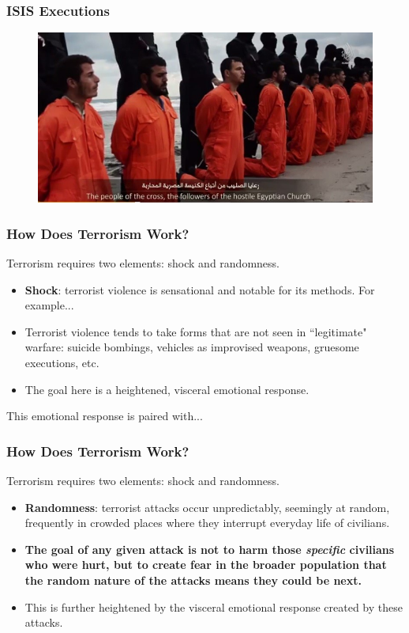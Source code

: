 \documentclass{beamer}
\begin{document}
\begin{frame} 
	\frametitle{\LARGE{ISIS Executions}}
	\begin{figure}[ht!]
		\centering
		\includegraphics[width=\textwidth,height=0.9\textheight,keepaspectratio]{ISISexec.jpg}
	\end{figure}
\end{frame}

\begin{frame} 
	\frametitle{\LARGE{How Does Terrorism Work?}}
	Terrorism requires two elements: shock and randomness.
	\begin{itemize}
		\item \textbf{Shock}: terrorist violence is sensational and notable for its methods. For example...	
		\item Terrorist violence tends to take forms that are not seen in ``legitimate" warfare: suicide bombings, vehicles as improvised weapons, gruesome executions, etc. \pause
		\item The goal here is a heightened, visceral emotional response.	
	\end{itemize}
This emotional response is paired with...
\end{frame}

\begin{frame} 
	\frametitle{\LARGE{How Does Terrorism Work?}}
Terrorism requires two elements: shock and randomness.
	\begin{itemize}
		\item \textbf{Randomness}: terrorist attacks occur unpredictably, seemingly at random, frequently in crowded places where they interrupt everyday life of civilians. \pause
		\item \textbf{The goal of any given attack is not to harm those \textit{specific} civilians who were hurt, but to create fear in the broader population that the random nature of the attacks means they could be next.} \pause
		\item This is further heightened by the visceral emotional response created by these attacks.
	\end{itemize}
\end{frame}
\end{document}
